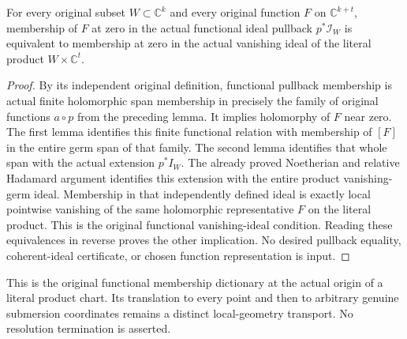 \begin{theorem}
\label{hir:actual-cylinder-functional-pullback-origin}
\leanok
For every original subset $W\subset\mathbb C^k$ and every original
function $F$ on $\mathbb C^{k+t}$, membership of $F$ at zero in the
actual functional ideal pullback $p^*\mathcal I_W$ is equivalent to
membership at zero in the actual vanishing ideal of the literal product
$W\times\mathbb C^t$.
\end{theorem}
\begin{proof}
By its independent original definition, functional pullback membership
is actual finite holomorphic span membership in precisely the family
of original functions $a\circ p$ from the preceding lemma. It implies
holomorphy of $F$ near zero. The first lemma identifies this finite
functional relation with membership of $[F]$ in the entire germ span
of that family. The second lemma identifies that whole span with the
actual extension $p^*I_W$. The already proved Noetherian and relative
Hadamard argument identifies this extension with the entire product
vanishing-germ ideal. Membership in that independently defined ideal
is exactly local pointwise vanishing of the same holomorphic
representative $F$ on the literal product. This is the original
functional vanishing-ideal condition. Reading these equivalences in
reverse proves the other implication. No desired pullback equality,
coherent-ideal certificate, or chosen function representation is input.
\end{proof}

This is the original functional membership dictionary at the actual origin
of a literal product chart. Its translation to every point and then to
arbitrary genuine submersion coordinates remains a distinct local-geometry
transport. No resolution termination is asserted.
